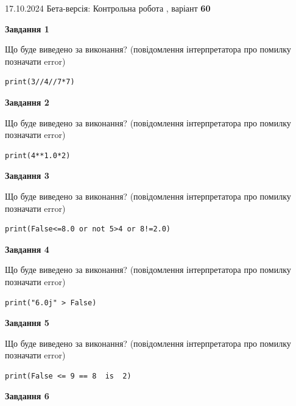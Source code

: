 \documentclass[12pt, ukrainian]{article}
\begin{document}
{\Large{17.10.2024 Бета-версія: Контрольна робота , варіант  \No \textbf { 60 }\par}}
{
\begin {large}
{\begin {center}\textbf{Завдання 1}\end {center}}

Що буде виведено за виконання? (повідомлення інтерпретатора про помилку позначати error)\par
\begin{verbatim}
print(3//4//7*7)
\end{verbatim}

{\begin {center}\textbf{Завдання 2}\end {center}}

Що буде виведено за виконання? (повідомлення інтерпретатора про помилку позначати error)\par
\begin{verbatim}
print(4**1.0*2)
\end{verbatim}

{\begin {center}\textbf{Завдання 3}\end {center}}

Що буде виведено за виконання? (повідомлення інтерпретатора про помилку позначати error)\par
\begin{verbatim}
print(False<=8.0 or not 5>4 or 8!=2.0)
\end{verbatim}

{\begin {center}\textbf{Завдання 4}\end {center}}

Що буде виведено за виконання? (повідомлення інтерпретатора про помилку позначати error)\par
\begin{verbatim}
print("6.0j" > False)
\end{verbatim}

{\begin {center}\textbf{Завдання 5}\end {center}}

Що буде виведено за виконання? (повідомлення інтерпретатора про помилку позначати error)\par
\begin{verbatim}
print(False <= 9 == 8  is  2)
\end{verbatim}

{\begin {center}\textbf{Завдання 6}\end {center}}


\end{large}}
\end{document}
